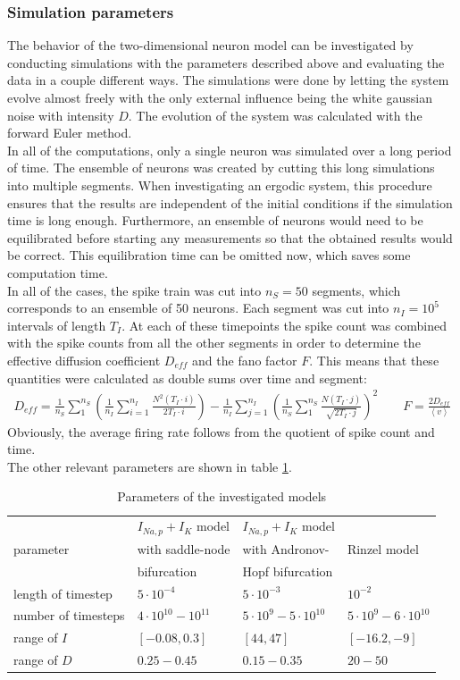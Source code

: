 \documentclass[12pt,a4paper]{article}
\begin{document}
\subsubsection{Simulation parameters}
The behavior of the two-dimensional neuron model can be investigated by conducting simulations with the parameters described above and evaluating the data in a couple different ways. The simulations were done by letting the system evolve almost freely with the only external influence being the white gaussian noise with intensity $D$. The evolution of the system was calculated with the forward Euler method.\\
In all of the computations, only a single neuron was simulated over a long period of time. The ensemble of neurons was created by cutting this long simulations into multiple segments. When investigating an ergodic system, this procedure ensures that the results are independent of the initial conditions if the simulation time is long enough. Furthermore, an ensemble of neurons would need to be equilibrated before starting any measurements so that the obtained results would be correct. This equilibration time can be omitted now, which saves some computation time. \\
In all of the cases, the spike train was cut into $n_S=50$ segments, which corresponds to an ensemble of 50 neurons. Each segment was cut into $n_I=10^5$ intervals of length $T_I$. At each of these timepoints the spike count was combined with the spike counts from all the other segments in order to determine the effective diffusion coefficient $D_{eff}$ and the fano factor $F$. This means that these quantities were calculated as double sums over time and segment:
\begin{align*}
D_{eff}=\frac{1}{n_S}\sum_{1}^{n_S}\left(\frac{1}{n_I}\sum_{i=1}^{n_I}\frac{N^2(T_I\cdot i)}{2T_I\cdot i}\right)-\frac{1}{n_I}\sum_{j=1}^{n_I}\left(\frac{1}{n_S}\sum_{1}^{n_S}\frac{N(T_I\cdot j)}{\sqrt{2T_I\cdot j}}\right)^2\qquad F=\frac{2D_{eff}}{\left<v\right>}
\end{align*}
Obviously, the average firing rate follows from the quotient of spike count and time.\\
The other relevant parameters are shown in table \ref{params}.
\begin{table}[h]

\begin{tabular}{|l|l|l|l|}
	\hline
	 & $I_{Na,p}+I_K$ model  & $I_{Na,p}+I_K$ model & \\ parameter &  with saddle-node & with Andronov- &Rinzel model\\ & bifurcation & Hopf bifurcation &\\
	\hline
	length of timestep&$5\cdot 10^{-4}$&$5\cdot10^{-3}$&$10^{-2}$\\\hline
	number of timesteps&$4\cdot10^{10}-10^{11}$&$5\cdot10^9-5\cdot10^{10}$&$5\cdot10^9-6\cdot10^{10}$\\\hline
	range of $I$&$[-0.08,0.3]$&$[44,47]$&$[-16.2,-9]$\\\hline
	range of $D$&$0.25-0.45$&$0.15-0.35$&$20-50$\\
	\hline
\end{tabular}
\caption{Parameters of the investigated models}	
\label{params}
\end{table}
\end{document}
